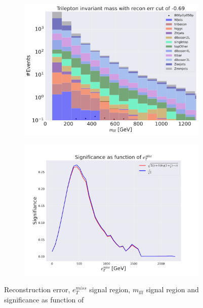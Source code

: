 \begin{figure}[H]
    \hfill
    \begin{subfigure}{.40\textwidth}
        \includegraphics[width=\textwidth]{Figures/VAE_testing/small/3lep/b_data_recon_big_rm3_feats_sig_800p0p050p_mlll_recon_errcut_-0.69.pdf}
        \caption{}
        \label{fig:VAE_3lep_small_mlll_800_2}
    \end{subfigure}
    \hfill   
    \begin{subfigure}{.40\textwidth}
        \includegraphics[width=\textwidth]{Figures/VAE_testing/small/3lep/significance_etmiss_800p0p050p_-0.6856921439167579.pdf}
        \caption{}
        \label{fig:VAE_3lep_small_signi_800_2}
    \end{subfigure}
    \hfill      
    \caption[3lep shallow network | $800p50$ | VAE | 2]{Reconstruction error, $e_T^{miss}$ signal region, $m_{lll}$ signal region and significance as function of 
}
\end{figure}
